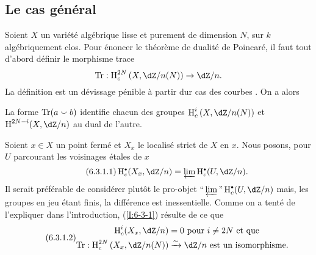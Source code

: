 









\subsection{Le cas général}\label{I:6-3}

Soient $X$ un variété algébrique lisse et purement de dimension $N$, sur 
$k$ algébriquement clos. Pour énoncer le théorème de dualité de 
Poincaré, il faut tout d'abord définir le morphisme trace 
\[
  \tr : \h_c^{2N}\left(X,\dZ/n(N)\right) \to \dZ/n\text{.}
\]
La définition est un dévissage pénible à partir dur cas des courbes 
\cite[XVIII \S 2]{sga4}. On a alors 





\begin{theorem}\label{I:6-3-1}
La forme $\operatorname{Tr}(a\smallsmile b)$ identifie chacun des groupes 
$\h_c^i\left(X,\dZ/n(N)\right)$ et $\h^{2 N-i}(X,\dZ/n)$ au dual de l'autre.
\end{theorem}

Soient $x\in X$ un point fermé et $X_x$ le localisé strict de $X$ en $x$. 
Nous posons, pour $U$ parcourant les voisinages étales de $x$ 
\begin{equation*}\tag{6.3.1.1}\label{I:eq:6-3-1-1}
  \h_c^\bullet(X_x,\dZ/n) = \varprojlim \h_c^\bullet(U,\dZ/n) \text{.}
\end{equation*}
Il serait préférable de considérer plutôt le pro-objet 
$\text{``}\varprojlim\text{''} \h_c^\bullet(U,\dZ/n)$ mais, les groupes en jeu 
étant finis, la différence est inessentielle. Comme on a tenté de 
l'expliquer dans l'introduction, (\ref{I:6-3-1}) résulte de ce que 
\begin{equation*}\tag{6.3.1.2}\label{I:eq:6-3-1-2}
\begin{aligned}
  \h_c^i(X_x,\dZ/n) &= 0 \text{ pour $i\ne 2N$ et que } \\
  \tr : \h_c^{2 N}\left(X_x,  \dZ/n(N)\right) &\iso \dZ/n \text{ est un isomorphisme.} 
\end{aligned}
\end{equation*}

